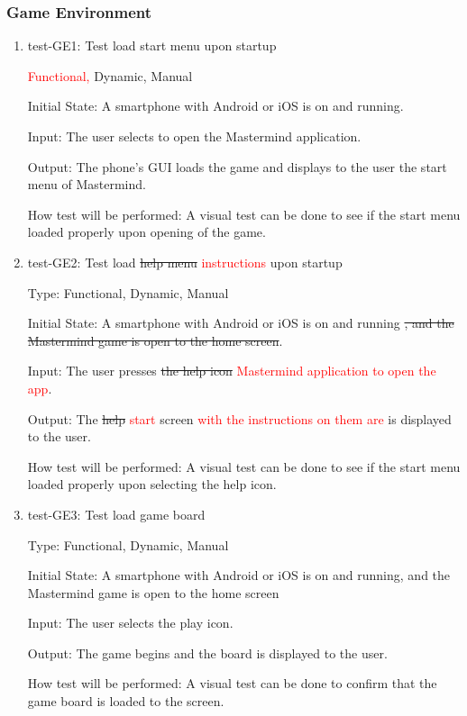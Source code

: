 \documentclass[12pt, titlepage]{article}
\begin{document}
\subsubsection{Game Environment}

\begin{enumerate}

\item{test-GE1: Test load start menu upon startup\\}

\textcolor{red}{Functional, }Dynamic, Manual
					
Initial State: A smartphone with Android or iOS is on and running.
					
Input: The user selects to open the Mastermind application.
					
Output: The phone's GUI loads the game and displays to the user the start menu of Mastermind.
					
How test will be performed: A visual test can be done to see if the start menu loaded properly upon opening of the game.

\item{test-GE2: Test load \sout{help menu} \textcolor{red}{instructions} upon startup\\}

Type: Functional, Dynamic, Manual
					
Initial State: A smartphone with Android or iOS is on and running \sout{, and the Mastermind game is open to the home screen}.
					
Input: The user presses \sout{the help icon} \textcolor{red}{Mastermind application to open the app}.
					
Output: The \sout{help} \textcolor{red}{start} screen  \textcolor{red}{with the instructions on them are} is displayed to the user.
					
How test will be performed: A visual test can be done to see if the start menu loaded properly upon selecting the help icon.

\item{test-GE3: Test load game board\\}

Type: Functional, Dynamic, Manual
					
Initial State: A smartphone with Android or iOS is on and running, and the Mastermind game is open to the home screen
					
Input: The user selects the play icon.
					
Output: The game begins and the board is displayed to the user.
					
How test will be performed: A visual test can be done to confirm that the game board is loaded to the screen.

\end{enumerate}
\end{document}
